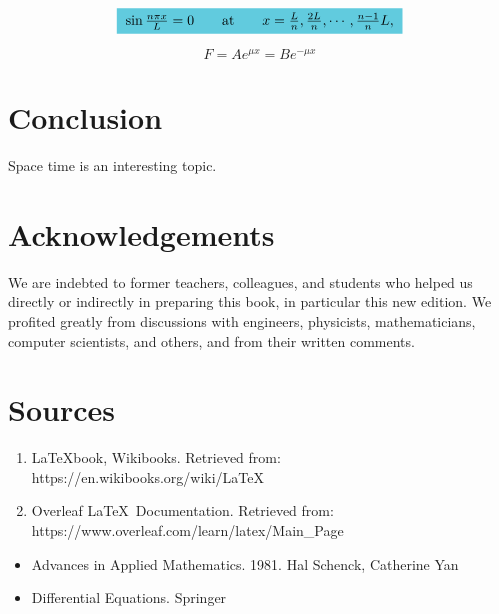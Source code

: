\documentclass[12pt, a4paper, leqno]{amsart}
\begin{document}
\begin{equation}
\colorbox{SkyBlue}{                                                     
    $\sin{\frac{n\pi x}{L}}=0 \qquad \text{at} \\                             
    \qquad x=\frac{L}{n}, \frac{2L}{n},\dotsb,\frac{n-1}{n}L,$
}                 
\end{equation}  

\begin{equation}                                                                
    F=Ae^{\mu x} = Be^{-\mu x}                                                  
\end{equation}   

\section{Conclusion}


Space time is an interesting topic.


\section{Acknowledgements}

We are indebted to former teachers, colleagues, and students who helped us 
directly or indirectly in preparing this book, in particular this new edition. 
We profited greatly from discussions with engineers, physicists, 
mathematicians, computer scientists, and others, and from their written 
comments.

\section{Sources}

\begin{enumerate}
    \item \LaTeX book, Wikibooks. Retrieved from: https://en.wikibooks.org/wiki/LaTeX
    \item Overleaf \LaTeX\ Documentation. Retrieved from: \newline
        https://www.overleaf.com/learn/latex/Main\_Page
\end{enumerate}
\begin{itemize}
    \item Advances in Applied Mathematics. 1981. Hal Schenck, Catherine Yan
    \item Differential Equations. Springer
\end{itemize}
\end{document}
